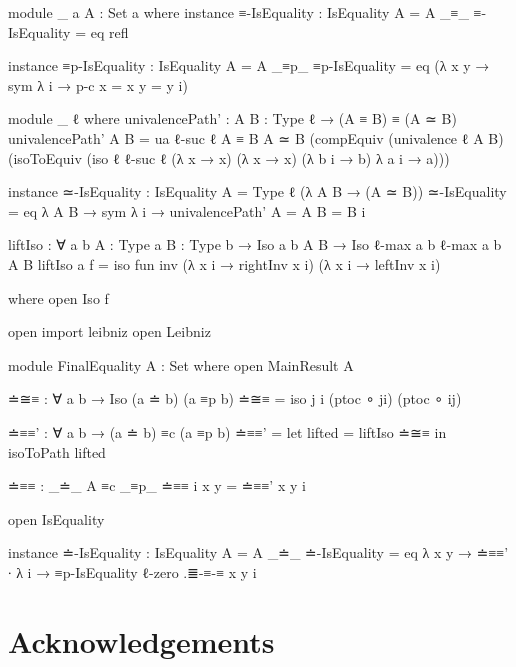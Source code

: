 \documentclass{article}
\begin{document}
\begin{code}
module _ {a} {A : Set a} where
  instance
    ≡-IsEquality : IsEquality {A = A} _≡_
    ≡-IsEquality = eq refl

  instance
    ≡p-IsEquality : IsEquality {A = A} _≡p_
    ≡p-IsEquality = eq (λ {x y} → sym λ i → p-c {x = x} {y = y} i)


module _ {ℓ} where
  univalencePath' : {A B : Type ℓ} → (A ≡ B) ≡ (A ≃ B)
  univalencePath' {A} {B} =
    ua {ℓ-suc ℓ} {A ≡ B} {A ≃ B} (compEquiv (univalence {ℓ} {A} {B})
    (isoToEquiv (iso {ℓ} {ℓ-suc ℓ}
    (λ x → x) (λ x → x) (λ b i → b) λ a i → a)))

  instance
    ≃-IsEquality : IsEquality
      {A = Type ℓ} (λ A B → (A ≃ B))
    ≃-IsEquality = eq λ {A B} → sym
      λ i → univalencePath' {A = A} {B = B} i

liftIso : ∀ {a b} {A : Type a} {B : Type b}
  → Iso {a} {b} A B → Iso {ℓ-max a b} {ℓ-max a b} A B
liftIso {a} f = iso fun inv
  (λ x i → rightInv x i) (λ x i → leftInv x i)

  where open Iso f

open import leibniz
open Leibniz

module FinalEquality {A : Set} where
  open MainResult A

  ≐≅≡ : ∀ {a b} → Iso (a ≐ b) (a ≡p b)
  ≐≅≡ = iso j i (ptoc ∘ ji) (ptoc ∘ ij)

  ≐≡≡' : ∀ {a b} → (a ≐ b) ≡c (a ≡p b)
  ≐≡≡' = let lifted = liftIso ≐≅≡  in isoToPath lifted

  ≐≡≡ : _≐_ {A} ≡c _≡p_
  ≐≡≡ i x y = ≐≡≡' {x} {y} i

  open IsEquality

  instance
    ≐-IsEquality : IsEquality {A = A} _≐_
    ≐-IsEquality = eq λ {x} {y} → ≐≡≡' ∙
      λ i → ≡p-IsEquality {ℓ-zero} .≣-≡-≡ {x} {y} i
\end{code}



\section*{Acknowledgements}



\end{document}

